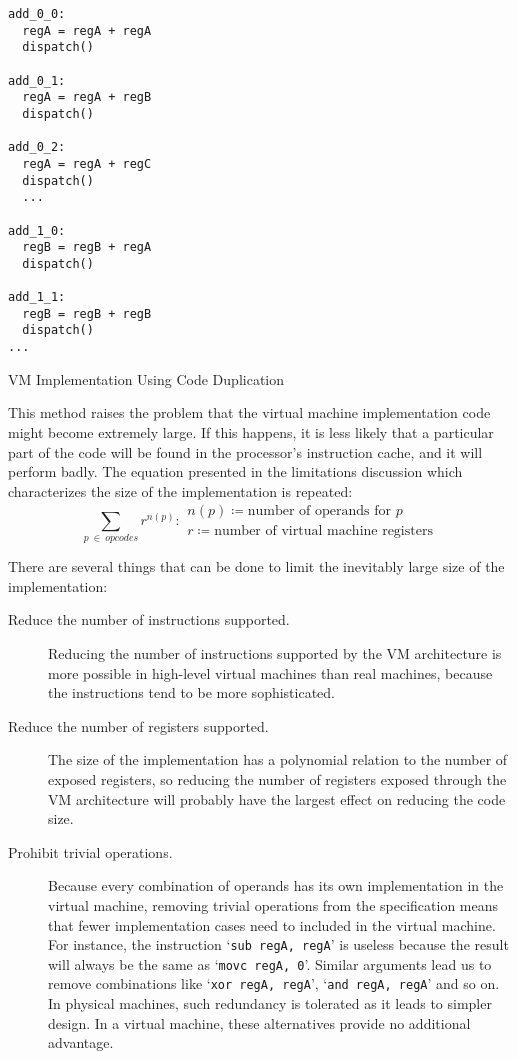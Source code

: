 	\begin{myfigure}
		\begin{lstlisting}
add_0_0:
  regA = regA + regA
  dispatch()

add_0_1:
  regA = regA + regB
  dispatch()

add_0_2:
  regA = regA + regC
  dispatch()
  ...

add_1_0:
  regB = regB + regA
  dispatch()

add_1_1:
  regB = regB + regB
  dispatch()
...		
		\end{lstlisting}
		\caption{VM Implementation Using Code Duplication}
		\label{fig:dupimplementation}
	\end{myfigure}
	
	This method raises the problem that the virtual machine implementation code might become extremely large. If this happens, it is less likely that a particular part of the code will be found in the processor's instruction cache, and it will perform badly. The equation presented in the limitations discussion which characterizes the size of the implementation is repeated:
	\nopagebreak
	\[
		\sum_{p~\in~opcodes} r^{n(p)} : 
		\begin{array}{l}
			n(p) \coloneqq \text{number of operands for $p$} \\
			r \coloneqq \text{number of virtual machine registers}
		\end{array}
	\] 
	
	There are several things that can be done to limit the inevitably large size of the implementation:
	
	\begin{description}
		\item[Reduce the number of instructions supported.] Reducing the number of instructions supported by the VM architecture is more possible in high-level virtual machines than real machines, because the instructions tend to be more sophisticated.
		\item[Reduce the number of registers supported.] The size of the implementation has a polynomial relation to the number of exposed registers, so reducing the number of registers exposed through the VM architecture will probably have the largest effect on reducing the code size.
		\item[Prohibit trivial operations.] Because every combination of operands has its own implementation in the virtual machine, removing trivial operations from the specification means that fewer implementation cases need to included in the virtual machine. For instance, the instruction `\texttt{sub regA, regA}' is useless because the result will always be the same as `\texttt{movc regA, 0}'. Similar arguments lead us to remove combinations like `\texttt{xor regA, regA}', `\texttt{and regA, regA}' and so on. In physical machines, such redundancy is tolerated as it leads to simpler design. In a virtual machine, these alternatives provide no additional advantage.
	\end{description}
	
